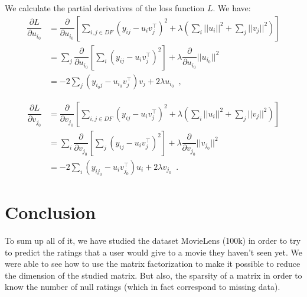 \documentclass{article}
\begin{document}
We calculate the partial derivatives of the loss function $L$. We have:
\begin{align*}
    \dfrac{\partial L }{\partial u_{i_0}}&=\dfrac{\partial}{\partial u_{i_0}}\left[\sum_{i,j \in DF} (y_{ij} - u_i v_j^{\top} )^2 + \lambda\left(\sum_i || u_i ||^2 + \sum_j || v_j ||^2\right)\right]\\
    &=\sum_j \dfrac{\partial}{\partial u_{i_0}}\left[\sum_i (y_{ij} - u_i v_j^{\top} )^2\right] + \lambda \dfrac{\partial}{\partial u_{i_0}} ||u_{i_0} ||^2\\
    &= -2 \sum_j (y_{i_0j} -  u_{i_0} v_{j}^{\top} )v_j + 2\lambda u_{i_0} \enspace ,
\end{align*}

\begin{align*}
    \dfrac{\partial L }{\partial v_{j_0}}&=\dfrac{\partial}{\partial v_{j_0}}\left[\sum_{i,j \in DF} (y_{ij} - u_i v_j^{\top} )^2 + \lambda\left(\sum_i || u_i ||^2 + \sum_j || v_j ||^2\right)\right]\\
    &=\sum_i \dfrac{\partial}{\partial v_{j_0}}\left[\sum_j (y_{ij} - u_i v_j^{\top} )^2\right] + \lambda \dfrac{\partial}{\partial v_{j_0}} ||v_{j_0} ||^2\\
    &= -2 \sum_i (y_{ij_0} -  u_i v_{j_0}^{\top} )u_i + 2\lambda v_{j_0} \enspace .
\end{align*}

\section*{Conclusion}
To sum up all of it, we have studied the dataset MovieLens (100k) in order to try to predict the ratings that a user would give to a movie they haven't seen yet.
We were able to see how to use the matrix factorization to make it possible to reduce the dimension of the studied matrix.
But also, the sparsity of a matrix in order to know the number of null ratings (which in fact correspond to missing data).


\nocite{*}
\printbibliography
\end{document}
